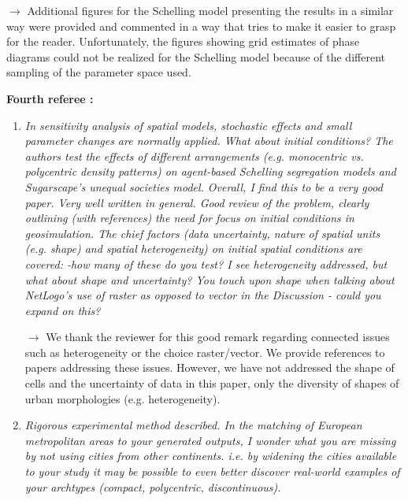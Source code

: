 \documentclass[11pt,a4paper,sans]{moderncv}        %
\begin{document}
\begin{enumerate}
	\medskip
	
	
	$\rightarrow$ Additional figures for the Schelling model presenting the results in a similar way were provided and commented in a way that tries to make it easier to grasp for the reader. Unfortunately, the figures showing grid estimates of phase diagrams could not be realized for the Schelling model because of the different sampling of the parameter space used.

\end{enumerate}


\bigskip
\bigskip

\textbf{Fourth referee :}
 

\bigskip


\begin{enumerate}
	\item \textit{In sensitivity analysis of spatial models, stochastic effects and small parameter changes are normally applied. What about initial conditions? The authors test the effects of different arrangements (e.g. monocentric vs. polycentric density patterns) on agent-based Schelling segregation models and Sugarscape's unequal societies model. Overall, I find this to be a very good paper. Very well written in general. Good review of the problem, clearly outlining (with references) the need for focus on initial conditions in geosimulation. The chief factors (data uncertainty, nature of spatial units (e.g. shape) and spatial heterogeneity) on initial spatial conditions are covered: -how many of these do you test? I see heterogeneity addressed, but what about shape and uncertainty? You touch upon shape when talking about NetLogo's use of raster as opposed to vector in the Discussion - could you expand on this?}
	
	\medskip
	
	$\rightarrow$ We thank the reviewer for this good remark regarding connected issues such as heterogeneity or the choice raster/vector. We provide references to papers addressing these issues. However, we have not addressed the shape of cells and the uncertainty of data in this paper, only the diversity of shapes of urban morphologies (e.g. heterogeneity). 
	\bigskip
	
	\item \textit{Rigorous experimental method described. In the matching of European metropolitan areas to your generated outputs, I wonder what you are missing by not using cities from other continents. i.e. by widening the cities available to your study it may be possible to even better discover real-world examples of your archtypes (compact, polycentric, discontinuous).}
	

\end{enumerate}
\end{document}
